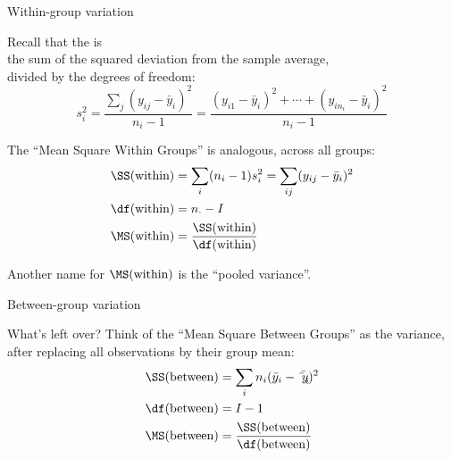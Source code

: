 \begin{frame}{Within-group variation}

  Recall that the  is \\
  the sum of the squared deviation from the sample average,\\
  divided by the degrees of freedom:
  \[
  s_i^2 = \frac{ \sum_j (y_{ij}-\bar y_i)^2 }{ n_i-1 } = \frac{ (y_{i1} - \bar y_i)^2 + \cdots + (y_{in_i} - \bar y_i)^2 }{n_i-1}
  \]

    \vspace{2em}

    The ``\alert{Mean Square Within Groups}'' is analogous, across all groups:
    \begin{align*}
      \SS(\text{within}) &= \sum_{i} (n_i-1) s_i^2 = \sum_{ij} (y_{ij}-\bar y_i)^2 \\
      \df(\text{within}) &= n_\cdot - I \\
      \MS(\text{within}) &= \frac{\SS(\text{within})}{\df(\text{within})}
    \end{align*}

    Another name for $\MS(\text{within})$ is the ``pooled variance''.

\end{frame}

\begin{frame}{Between-group variation}

  What's left over? 
  Think of the ``\alert{Mean Square Between Groups}'' 
  as the variance, after replacing all observations by their group mean:
  \begin{align*}
    \SS(\text{between}) &= \sum_{i} n_i (\bar y_i - \bar{\bar y_i})^2 \\
      \df(\text{between}) &= I - 1 \\
      \MS(\text{between}) &= \frac{\SS(\text{between})}{\df(\text{between})}
  \end{align*}

\end{frame}

